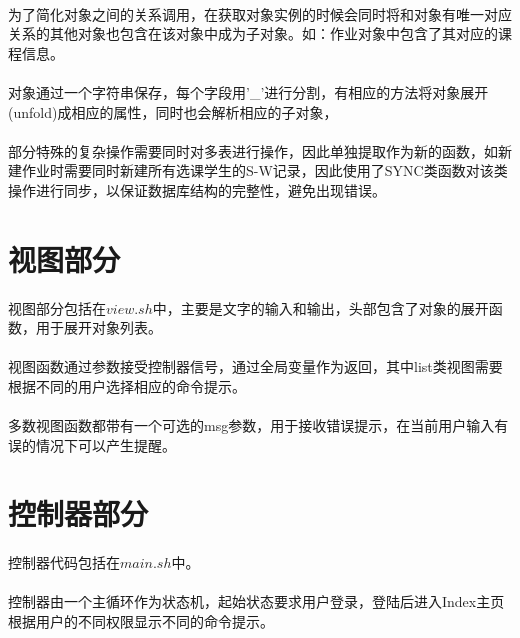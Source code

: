 \documentclass[notitlepage,cs4size,punct,oneside]{report}
\begin{document}
\begin{CJK}{UTF8}{hei}
\paragraph{}为了简化对象之间的关系调用，在获取对象实例的时候会同时将和对象有唯一对应关系的其他对象也包含在该对象中成为子对象。如：作业对象中包含了其对应的课程信息。
\paragraph{}对象通过一个字符串保存，每个字段用'\_'进行分割，有相应的方法将对象展开(unfold)成相应的属性，同时也会解析相应的子对象，
\paragraph{}部分特殊的复杂操作需要同时对多表进行操作，因此单独提取作为新的函数，如新建作业时需要同时新建所有选课学生的S-W记录，因此使用了SYNC类函数对该类操作进行同步，以保证数据库结构的完整性，避免出现错误。

\section{视图部分}
\paragraph{}视图部分包括在$view.sh$中，主要是文字的输入和输出，头部包含了对象的展开函数，用于展开对象列表。
\paragraph{}视图函数通过参数接受控制器信号，通过全局变量作为返回，其中list类视图需要根据不同的用户选择相应的命令提示。
\paragraph{}多数视图函数都带有一个可选的msg参数，用于接收错误提示，在当前用户输入有误的情况下可以产生提醒。

\section{控制器部分}
\paragraph{}控制器代码包括在$main.sh$中。
\paragraph{}控制器由一个主循环作为状态机，起始状态要求用户登录，登陆后进入Index主页根据用户的不同权限显示不同的命令提示。

\end{CJK}
\end{document}
